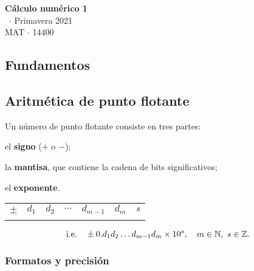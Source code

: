 \documentclass[8pt,a4paper]{extarticle}
\renewcommand{\csClass}{Cálculo numérico 1}
\renewcommand{\csClassCode}{MAT $\cdot$ 14400}
\renewcommand{\csTerm}{Primavera 2021}
\begin{document}
\begin{titlepage}
	\begin{center}
		\vspace*{1cm}
		\Huge
		\textbf{\csClass}
		\vspace{0.5cm} \\
		\Large
		\cs\ $\cdot$ \csTerm
		\vfill
		\csAuthorName\\
		\vspace{0.8cm}
		\csClassCode\\
		\csSchool
	\end{center}
\end{titlepage}

\begin{multicols}{3}
	\setcounter{page}{1}

	\section*{Fundamentos}

	\subsection{Aritmética de punto flotante}

	Un número de punto flotante consiste en tres partes:

	\begin{numberlist}
		\item el \textbf{signo} ($+$ o $-$);
		\item la \textbf{mantisa}, que contiene la cadena de bits significativos;
		\item el \textbf{exponente}.
	\end{numberlist}

	\begin{center}
		\begin{tabular}{| c || c | c | c | c | c || c |}
			\hhline{-||-----||-}
			$\pm$ & $d_1$ & $d_2$ & $\cdots$ & $d_{m-1}$ & $d_m$ & $s$ \\
			\hhline{-||-----||-}
		\end{tabular}
	\end{center}

	\[
		\text{\normalfont i.e.} \quad \pm 0.d_1 d_2 \ldots d_{m-1} d_m \times 10^s, \quad m \in \mathbb{N},\ s \in \mathbb{Z}
		.\]

	\subsubsection*{Formatos y precisión}


\end{multicols}
\end{document}
